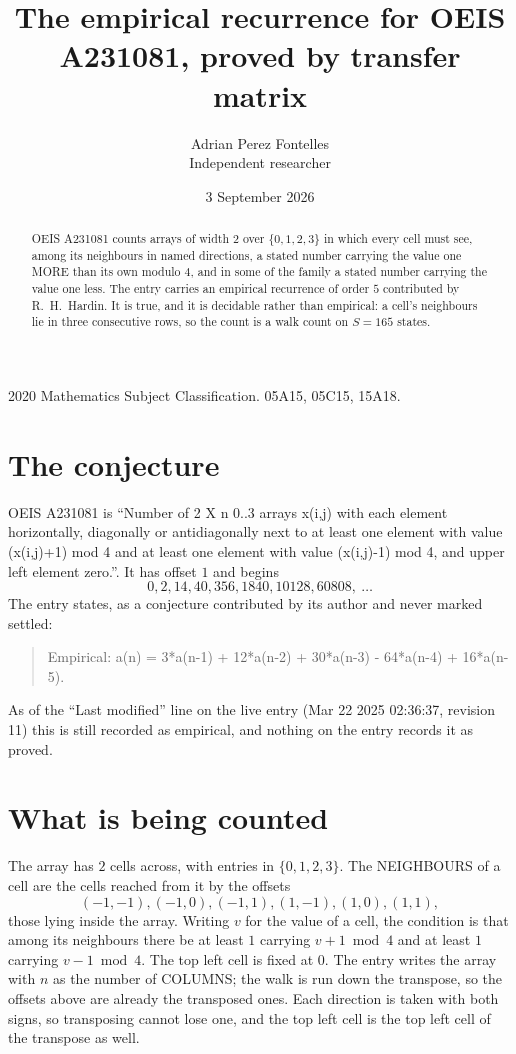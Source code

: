 \documentclass[11pt,a4paper]{article}
\title{The empirical recurrence for OEIS A231081, proved by transfer matrix}
\author{Adrian Perez Fontelles\\ \small Independent researcher}
\date{3 September 2026}
\theoremstyle{plain}
\theoremstyle{definition}
\begin{document}
\maketitle

\begin{abstract}
OEIS A231081 counts arrays of width $2$ over $\{0,1,2,3\}$ in which every cell must see, among its
neighbours in named directions, a stated number carrying the value one MORE than its own
modulo $4$, and in some of the family a stated number carrying the value one less. The entry
carries an empirical recurrence of order $5$ contributed by R.~H.~Hardin. It is true, and
it is decidable rather than empirical: a cell's neighbours lie in three consecutive rows, so
the count is a walk count on $S=165$ states.
\end{abstract}

\noindent\small 2020 Mathematics Subject Classification. 05A15, 05C15, 15A18.\normalsize

\section{The conjecture}

OEIS A231081 is ``Number of 2 X n 0..3 arrays x(i,j) with each element horizontally, diagonally or antidiagonally next to at least one element with value (x(i,j)+1) mod 4 and at least one element with value (x(i,j)-1) mod 4, and upper left element zero.''. It has offset $1$ and begins
\[
0, 2, 14, 40, 356, 1840, 10128, 60808,\ \dots
\]
The entry states, as a conjecture contributed by its author and never marked settled:
\begin{quote}
Empirical: a(n) = 3*a(n-1) + 12*a(n-2) + 30*a(n-3) - 64*a(n-4) + 16*a(n-5).
\end{quote}
As of the ``Last modified'' line on the live entry (Mar 22 2025 02:36:37, revision 11) this is still
recorded as empirical, and nothing on the entry records it as proved.

\section{What is being counted}

The array has $2$ cells across, with entries in $\{0,1,2,3\}$. The NEIGHBOURS of a cell are the
cells reached from it by the offsets
\[
(-1,-1), (-1,0), (-1,1), (1,-1), (1,0), (1,1),
\]
those lying inside the array. Writing $v$ for the value of a cell, the condition is that among
its neighbours there be at least $1$ carrying $v+1 \bmod 4$ and at least $1$ carrying $v-1 \bmod 4$. The top left
cell is fixed at $0$. The entry writes the array with $n$ as the number of COLUMNS; the walk is run down the transpose, so the offsets above are already the transposed ones. Each direction is taken with both signs, so transposing cannot lose one, and the top left cell is the top left cell of the transpose as well.
\end{document}
